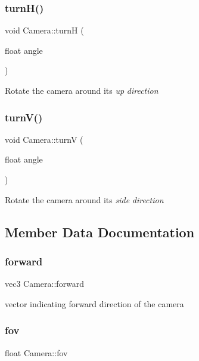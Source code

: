 \subsubsection{\texorpdfstring{turn\+H()}{turnH()}}
{\footnotesize\ttfamily void Camera\+::turnH (\begin{DoxyParamCaption}\item[{float}]{angle }\end{DoxyParamCaption})}

Rotate the camera around it\textquotesingle{}s {\itshape up} {\itshape direction} \mbox{\label{classCamera_a41ea4b455072dc7fa34d2093f5acd76c}} 
\subsubsection{\texorpdfstring{turn\+V()}{turnV()}}
{\footnotesize\ttfamily void Camera\+::turnV (\begin{DoxyParamCaption}\item[{float}]{angle }\end{DoxyParamCaption})}

Rotate the camera around it\textquotesingle{}s {\itshape side} {\itshape direction} 

\subsection{Member Data Documentation}
\mbox{\label{classCamera_a8bc7972da69be47469f8ee52b6647fe0}} 
\subsubsection{\texorpdfstring{forward}{forward}}
{\footnotesize\ttfamily vec3 Camera\+::forward\hspace{0.3cm}{\ttfamily [private]}}



vector indicating forward direction of the camera 

\mbox{\label{classCamera_aff7393c9cfbccd7e369091f00008da93}} 
\subsubsection{\texorpdfstring{fov}{fov}}
{\footnotesize\ttfamily float Camera\+::fov\hspace{0.3cm}{\ttfamily [private]}}



